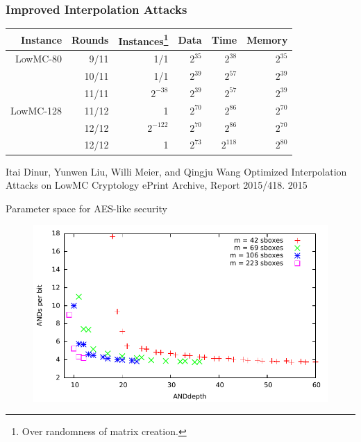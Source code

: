 \documentclass[10pt,compress]{beamer}
\begin{document}
\begin{frame}
  \frametitle{Improved Interpolation Attacks}

  \begin{tabular*}{1.0\linewidth}{rrrrrr}
    \toprule
    Instance & Rounds & Instances\footnote{Over randomness of matrix creation.} & Data     & Time     & Memory   \\
    \midrule
    LowMC-80 & 9/11   & 1/1       & $2^{35}$ &  $2^{38}$ & $2^{35}$\\
             & 10/11  & 1/1       & $2^{39}$ &  $2^{57}$ & $2^{39}$\\
             & 11/11  & $2^{-38}$  & $2^{39}$ &  $2^{57}$ & $2^{39}$\\
    \midrule
    LowMC-128 & 11/12 & 1         & $2^{70}$ &  $2^{86}$ & $2^{70}$\\
              & 12/12 & $2^{-122}$ & $2^{70}$ &  $2^{86}$ & $2^{70}$\\
              & 12/12 & 1         & $2^{73}$ & $2^{118}$ & $2^{80}$\\
    \bottomrule
  \end{tabular*}

  \begin{thebibliography}{FooBar}
    Itai Dinur, Yunwen Liu, Willi Meier, and Qingju Wang
    \newblock Optimized Interpolation Attacks on LowMC
    \newblock Cryptology ePrint Archive, Report 2015/418. 2015
  \end{thebibliography}
\end{frame}

\begin{frame}{Parameter space for AES-like security}
\begin{figure}
\centering
\includegraphics[scale=0.8]{figures/designspace.pdf}
\end{figure}
\end{frame}
\end{document}
